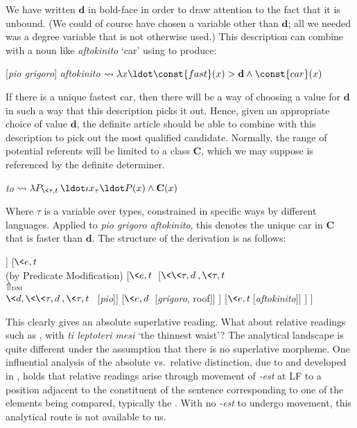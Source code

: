 \documentclass[output=paper
,modfonts
,nonflat]{langsci/langscibook}
\begin{document}
We have written $\textbf{d}$ in bold-face in order to draw attention to the fact that it is unbound. (We could of course have chosen a variable other than $\textbf{d}$; all we needed was a degree variable that is not otherwise used.)  This description can combine with a noun like \textit{aftokinito} `car' using  to produce:

\ea \label{ex:coppockstrand:82}
[\textit{pio grigoro}] \textit{aftokinito} $\leadsto \lambda x \ldot \const{fast}(x) > \textbf{d} \land \const{car}(x)$ 
\z 

If there is a unique fastest car, then there will be a way of choosing a value for $\textbf{d}$ in such a way that this description picks it out. Hence, given an appropriate choice of value $\textbf{d}$, the definite article should be able to combine with this description to pick out the most qualified candidate. Normally, the range of potential referents will be limited to a class $\textbf{C}$, which we may suppose is referenced by the definite determiner.


\ea \label{ex:coppockstrand:83}
\textit{to} $\leadsto \lambda P_{\<\tau,t\>} \ldot \iota x_\tau \ldot P(x) \land \textbf{C}(x)$
\z 

Where $\tau$ is a variable over types, constrained in specific ways by different languages.
Applied to \textit{pio grigoro aftokinito}, this denotes the unique car in $\textbf{C}$ that is faster than $\textbf{d}$. The structure of the derivation is as follows:

\ea{}  \label{ex:coppockstrand:84}\largerpage[3]
\begin{forest}
	[$e$
		[{$\<\<\tau,t\>,\tau\>$}[\textit{to}]]
		[{$\<e,t\>$\\(by Predicate Modification)}
			[{$\<e,t\>$}
				[{$\<\<\tau,d\>,\<\tau,t\>\>$\\$\Uparrow_{\textsc{dni}}$\\$\<d,\<\<\tau,d\>,\<\tau,t\>\>$} [\textit{pio}]]
				[{$\<e,d\>$} [\textit{grigoro}, roof]]
			]
			[{$\<e,t\>$}[\textit{aftokinito}]]
		]
	]
\end{forest}
\z 


This clearly gives an absolute superlative reading. What about relative readings such as , with \textit{ti leptoteri mesi}  `the thinnest waist'? The analytical landscape is quite different under the assumption that there is no superlative morpheme. One influential analysis of the absolute vs.\ relative distinction, due to \citet{Szabolcsi1986} and developed in \citet{Heim1999}, holds that relative readings arise through movement of \textit{-est} at LF to a position adjacent to the constituent of the sentence corresponding to one of the elements being compared, typically the . With no \textit{-est} to undergo movement, this analytical route is not available to us. 
\end{document}
